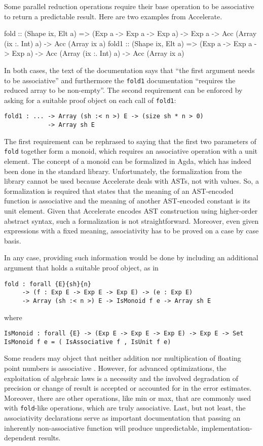 \documentclass{llncs}
\begin{document}
Some parallel reduction operations require their base operation to be
associative to return a predictable result. Here are two examples from
Accelerate. 
\begin{hcode}
fold  :: (Shape ix, Elt a) =>
         (Exp a -> Exp a -> Exp a) -> Exp a ->
         Acc (Array (ix :. Int) a) -> Acc (Array ix a)
fold1 :: (Shape ix, Elt a) =>
         (Exp a -> Exp a -> Exp a) ->
         Acc (Array (ix :. Int) a) -> Acc (Array ix a)
\end{hcode}
In both cases, the text of the documentation says that ``the first
argument needs to be associative'' and furthermore the \texttt{fold1}
documentation ``requires the reduced array to be non-empty''.
The second requirement can be enforced by asking for a suitable proof
object on each call of \texttt{fold1}:
\begin{verbatim}
fold1 : ... -> Array (sh :< n >) E -> (size sh * n > 0)
            -> Array sh E
\end{verbatim}
The first requirement can be rephrased to saying that the first two
parameters of \texttt{fold} together form a monoid, which requires an
associative operation with a unit element. The concept of a monoid
can be formalized in Agda, which has indeed been done in the standard
library. Unfortunately, the formalization from the library cannot be
used because Accelerate deals with ASTs, not with values. So, a
formalization is required that states that the meaning of an
AST-encoded function is associative and the meaning of another
AST-encoded constant is its unit element. Given that Accelerate
encodes AST construction using higher-order abstract syntax, such a
formalization is not straightforward. Moreover, even given expressions
with a fixed meaning, associativity has to be proved on a case by case
basis.

In any case, providing such information would be done by including an
additional argument that holds a suitable proof object, as in
\begin{verbatim}
fold : forall {E}{sh}{n}
     -> (f : Exp E -> Exp E -> Exp E) -> (e : Exp E)
     -> Array (sh :< n >) E -> IsMonoid f e -> Array sh E
\end{verbatim}
where
\begin{verbatim}
IsMonoid : forall {E} -> (Exp E -> Exp E -> Exp E) -> Exp E -> Set
IsMonoid f e = ( IsAssociative f , IsUnit f e)
\end{verbatim}

Some readers may object that neither addition nor multiplication of
floating point numbers is associative
\cite{DBLP:journals/csur/Goldberg91}. However, for advanced
optimizations, the exploitation of algebraic laws is a necessity and
the involved degradation of precision or change of result is accepted
or accounted for in the error estimates. Moreover, there are
other operations, like min or max, that are commonly used with
\texttt{fold}-like operations, which are truly associative. Last, but
not least, the associativity declarations serve as important
documentation that passing an inherently non-associative function will
produce unpredictable, implementation-dependent results.
\end{document}
